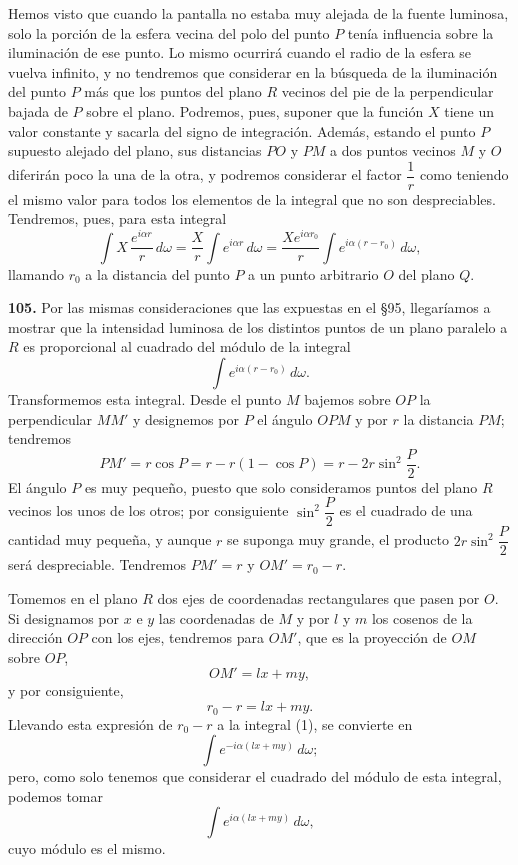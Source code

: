 Hemos visto que cuando la pantalla no estaba muy alejada de la fuente
luminosa, solo la porción de la esfera vecina del polo del punto $P$
tenía influencia sobre la iluminación de ese punto. Lo mismo ocurrirá
cuando el radio de la esfera se vuelva infinito, y no tendremos que
considerar en la búsqueda de la iluminación del punto $P$ más que los
puntos del plano $R$ vecinos del pie de la perpendicular bajada de $P$
sobre el plano. Podremos, pues, suponer que la función $X$ tiene un valor
constante y sacarla del signo de integración. Además, estando el punto
$P$ supuesto alejado del plano, sus distancias $PO$ y $PM$ a dos puntos
vecinos $M$ y $O$ diferirán poco la una de la otra, y podremos considerar
el factor $\dfrac1r$ como teniendo el mismo valor para todos los
elementos de la integral que no son despreciables. Tendremos, pues, para
esta integral
\[
\int X\,\frac{e^{i\alpha r}}{r}\,d\omega = \frac{X}{r}\int e^{i\alpha r}\,d\omega
= \frac{X e^{i\alpha r_0}}{r}\int e^{i\alpha(r-r_0)}\,d\omega,
\]
llamando $r_0$ a la distancia del punto $P$ a un punto arbitrario $O$ del
plano $Q$.

\noindent\textbf{105.} Por las mismas consideraciones que las expuestas
en el §95, llegaríamos a mostrar que la intensidad luminosa de los
distintos puntos de un plano paralelo a $R$ es proporcional al cuadrado
del módulo de la integral
\begin{equation}
\int e^{i\alpha(r-r_0)}\,d\omega.
\tag{1}
\end{equation}
Transformemos esta integral. Desde el punto $M$ bajemos sobre $OP$ la
perpendicular $MM'$ y designemos por $P$ el ángulo $OPM$ y por $r$ la
distancia $PM$; tendremos
\[
PM' = r\cos P = r - r(1-\cos P) = r - 2r\sin^2\frac{P}{2}.
\]
El ángulo $P$ es muy pequeño, puesto que solo consideramos puntos del
plano $R$ vecinos los unos de los otros; por consiguiente $\sin^2\dfrac{P}{2}$
es el cuadrado de una cantidad muy pequeña, y aunque $r$ se suponga muy
grande, el producto $2r\sin^2\dfrac{P}{2}$ será despreciable. Tendremos
$PM'=r$ y $OM'=r_0-r$.

Tomemos en el plano $R$ dos ejes de coordenadas rectangulares que pasen
por $O$. Si designamos por $x$ e $y$ las coordenadas de $M$ y por $l$ y
$m$ los cosenos de la dirección $OP$ con los ejes, tendremos para $OM'$,
que es la proyección de $OM$ sobre $OP$,
\[
OM' = lx+my,
\]
y por consiguiente,
\[
r_0-r = lx+my.
\]
Llevando esta expresión de $r_0-r$ a la integral (1), se convierte en
\[
\int e^{-i\alpha(lx+my)}\,d\omega;
\]
pero, como solo tenemos que considerar el cuadrado del módulo de esta
integral, podemos tomar
\begin{equation}
\int e^{i\alpha(lx+my)}\,d\omega,
\tag{2}
\end{equation}
cuyo módulo es el mismo.

